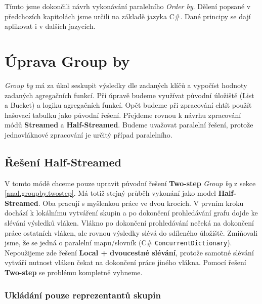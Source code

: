 Tímto jsme dokončili návrh vykonávání paralelního \textit{Order by}.
Dělení popsané v předchozích kapitolách jsme určili na základě jazyka C\#.
Dané principy se dají aplikovat i v dalších jazycích.

\section{Úprava Group by} \label{anal.improvement.groupby}

\textit{Group by} má za úkol seskupit výsledky dle zadaných klíčů a vypočíst hodnoty zadaných agregačních funkcí.
Při úpravě budeme využívat původní úložiště (List a Bucket) a logiku agregačních funkcí.
Opět budeme při zpracování chtít použít hašovací tabulku jako původní řešení.
Přejdeme rovnou k návrhu zpracování módů \textbf{Streamed} a \textbf{Half-Streamed}.
Budeme uvažovat paralelní řešení, protože jednovláknové zpracování je určitý případ paralelního.

\subsection{Řešení Half-Streamed} 

V tomto módě chceme pouze upravit původní řešení \textbf{Two-step} \textit{Group by} z sekce \ref{anal.groupby.twostep}.
Má totiž stejný průběh vykonání jako model \textbf{Half-Streamed}.
Oba pracují s myšlenkou práce ve dvou krocích.
V prvním kroku dochází k lokálnímu vytváření skupin a po dokončení prohledávání grafu dojde ke slévání výsledků vláken.
Vlákno po dokončení prohledávání nečeká na dokončení práce ostatních vláken, ale rovnou výsledky slévá do sdíleného úložiště.
Zmiňovali jsme, že se jedná o paralelní mapu/slovník (C\# \texttt{ConcurrentDictionary}).
Nepoužijeme zde řešení \textbf{Local + dvoucestné slévání}, protože samotné slévání vytváří nutnost vláken čekat na dokončení práce jiného vlákna.
Pomocí řešení \textbf{Two-step} se problému kompletně vyhneme.

\subsubsection{Ukládání pouze reprezentantů skupin} \label{anal.uprava.Groupby.table}

